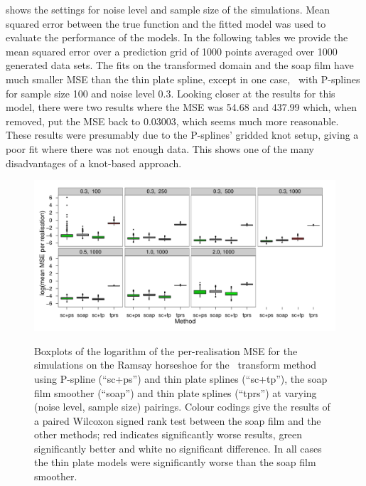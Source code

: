  shows the settings for noise level and sample size of the simulations. Mean squared error between the true function and the fitted model was used to evaluate the performance of the models. In the following tables we provide the mean squared error over a prediction grid of 1000 points averaged over 1000 generated data sets. The fits on the transformed domain and the soap film have much smaller MSE than the thin plate spline, except in one case, \sch\ with P-splines for sample size 100 and noise level 0.3. Looking closer at the results for this model, there were two results where the MSE was 54.68 and 437.99 which, when removed, put the MSE back to 0.03003, which seems much more reasonable. These results were presumably due to the P-splines' gridded knot setup, giving a poor fit where there was not enough data. This shows one of the many disadvantages of a knot-based approach.

\begin{figure}
\centering
\includegraphics{sc/tablecode/ramsay-boxplot.pdf} \\
\caption{Boxplots of the logarithm of the per-realisation MSE for the simulations on the Ramsay horseshoe for the \sch\ transform method using P-spline (``sc+ps'') and thin plate splines (``sc+tp''), the soap film smoother (``soap'') and thin plate splines (``tprs'') at varying (noise level, sample size) pairings. Colour codings give the results of a paired Wilcoxon signed rank test between the soap film and the other methods; red indicates significantly worse results, green significantly better and white no significant difference. In all cases the thin plate models were significantly worse than the soap film smoother.}
\label{sc-ram-boxplot}
\end{figure}



